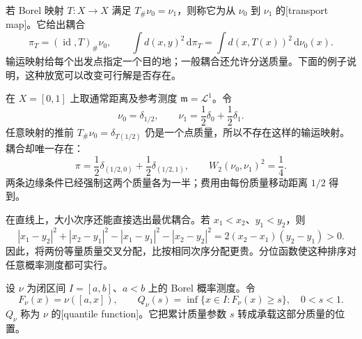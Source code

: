 \ProseParagraphBreak
若 Borel 映射 \(T:X\rightarrow X\) 满足 \(T_\#\nu_0=\nu_1\)，则称它为从 \(\nu_0\) 到 \(\nu_1\) 的[transport map]。它给出耦合
\[
	\pi_T=(\operatorname{id},T)_\#\nu_0,\qquad
	\int d(x,y)^2\,\mathrm d\pi_T=\int d(x,T(x))^2\,\mathrm d\nu_0(x).
\]
输运映射给每个出发点指定一个目的地；一般耦合还允许分送质量。下面的例子说明，这种放宽可以改变可行解是否存在。

\begin{example}\label{g3:exm:C-atomic-splitting}
	在 \(X=[0,1]\) 上取通常距离及参考测度 \(\mathfrak m=\mathcal L^1\)。令
	\[
		\nu_0=\delta_{1/2},\qquad
		\nu_1=\frac12\delta_0+\frac12\delta_1.
	\]
	任意映射的推前 \(T_\#\nu_0=\delta_{T(1/2)}\) 仍是一个点质量，所以不存在这样的输运映射。耦合却唯一存在：
	\[
		\pi=\frac12\delta_{(1/2,0)}+\frac12\delta_{(1/2,1)},
		\qquad
		W_2(\nu_0,\nu_1)^2=\frac14.
	\]
	两条边缘条件已经强制这两个质量各为一半；费用由每份质量移动距离 \(1/2\) 得到。
\end{example}

在直线上，大小次序还能直接选出最优耦合。若 \(x_1<x_2\)、\(y_1<y_2\)，则
\[
	|x_1-y_2|^2+|x_2-y_1|^2
	-|x_1-y_1|^2-|x_2-y_2|^2
	=2(x_2-x_1)(y_2-y_1)>0.
\]
因此，将两份等量质量交叉分配，比按相同次序分配更贵。分位函数使这种排序对任意概率测度都可实行。

\begin{definition}\label{g3:def:C-quantile-function}
	设 \(\nu\) 为闭区间 \(I=[a,b]\)、\(a<b\) 上的 Borel 概率测度。令
	\[
		F_\nu(x)=\nu([a,x]),\qquad
		Q_\nu(s)=\inf\{x\in I:F_\nu(x)\ge s\},
		\quad 0<s<1.
	\]
	\(Q_\nu\) 称为 \(\nu\) 的[quantile function]。它把累计质量参数 \(s\) 转成承载这部分质量的位置。
\end{definition}

